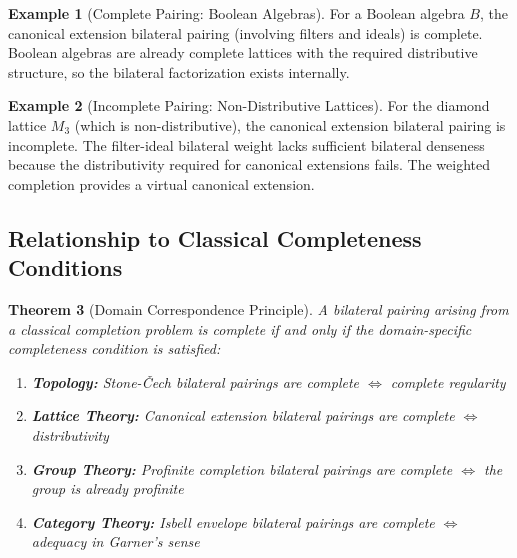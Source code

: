 \documentclass[11pt]{article}
\theoremstyle{plain}
\newtheorem{theorem}{Theorem}[section]
\theoremstyle{definition}
\newtheorem{example}[theorem]{Example}
\theoremstyle{remark}
\begin{document}
\begin{example}[Complete Pairing: Boolean Algebras]
For a Boolean algebra $B$, the canonical extension bilateral pairing (involving filters and ideals) is complete. Boolean algebras are already complete lattices with the required distributive structure, so the bilateral factorization exists internally.
\end{example}

\begin{example}[Incomplete Pairing: Non-Distributive Lattices]  
For the diamond lattice $M_3$ (which is non-distributive), the canonical extension bilateral pairing is incomplete. The filter-ideal bilateral weight lacks sufficient bilateral denseness because the distributivity required for canonical extensions fails. The weighted completion provides a virtual canonical extension.
\end{example}

\subsection{Relationship to Classical Completeness Conditions}

\begin{theorem}[Domain Correspondence Principle]\label{thm:domain-correspondence}
A bilateral pairing arising from a classical completion problem is complete if and only if the domain-specific completeness condition is satisfied:

\begin{enumerate}
\item \textbf{Topology:} Stone-\v{C}ech bilateral pairings are complete $\Leftrightarrow$ complete regularity
\item \textbf{Lattice Theory:} Canonical extension bilateral pairings are complete $\Leftrightarrow$ distributivity  
\item \textbf{Group Theory:} Profinite completion bilateral pairings are complete $\Leftrightarrow$ the group is already profinite
\item \textbf{Category Theory:} Isbell envelope bilateral pairings are complete $\Leftrightarrow$ adequacy in Garner's sense
\end{enumerate}
\end{theorem}
\end{document}
